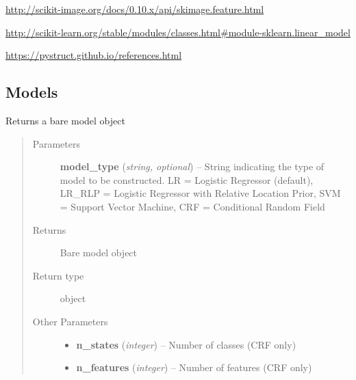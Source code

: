\documentclass[letterpaper,10pt,english]{sphinxmanual}
\begin{document}


\href{http://scikit-image.org/docs/0.10.x/api/skimage.feature.html}{http://scikit-image.org/docs/0.10.x/api/skimage.feature.html}






\href{http://scikit-learn.org/stable/modules/classes.html\#module-sklearn.linear\_model}{http://scikit-learn.org/stable/modules/classes.html\#module-sklearn.linear\_model}






\href{https://pystruct.github.io/references.html}{https://pystruct.github.io/references.html}




\subsection{Models}
\label{flamingo/classification/index:models}\label{flamingo/classification/index:module-flamingo.classification.models}

\begin{fulllineitems}
\label{flamingo/classification/index:flamingo.classification.models.get_model}
Returns a bare model object
\begin{quote}\begin{description}
\item[{Parameters}] \leavevmode
\textbf{model\_type} (\emph{string, optional}) -- String indicating the type of model to be constructed.
LR = Logistic Regressor (default), LR\_RLP = Logistic Regressor with Relative Location Prior, SVM = Support Vector Machine, CRF = Conditional Random Field

\item[{Returns}] \leavevmode
Bare model object

\item[{Return type}] \leavevmode
object

\item[{Other Parameters}] \leavevmode\begin{itemize}
\item {} 
\textbf{n\_states} (\emph{integer}) --
Number of classes (CRF only)

\item {} 
\textbf{n\_features} (\emph{integer}) --
Number of features (CRF only)

\end{itemize}

\end{description}\end{quote}

\end{fulllineitems}
\end{document}
